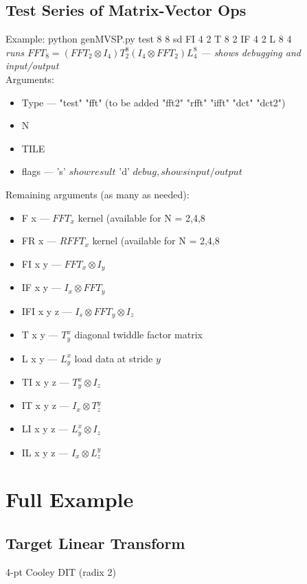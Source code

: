 \documentclass[11pt]{article}
\begin{document}
\subsection*{Test Series of Matrix-Vector Ops}
\noindent\makebox[\linewidth]{\rule{\textwidth}{1pt}} 
\newline Example: python genMVSP.py test 8 8 sd FI 4 2 T 8 2 IF 4 2 L 8 4\\
\emph{runs $FFT_8 = (FFT_2\otimes I_4)T^8_2(I_4\otimes FFT_2)L^8_4$ --- shows debugging and input/output}\\
\noindent\makebox[\linewidth]{\rule{\textwidth}{1pt}} 
\newline Arguments:
\begin{itemize}
\item Type --- "test" "fft" (to be added "fft2" "rfft" "ifft" "dct" "dct2")
\item N
\item TILE
\item flags --- 's' $show result$ 'd' $debug, shows input/output$
\end{itemize}
Remaining arguments (as many as needed):
\begin{itemize}
\item F x --- $FFT_{x}$ kernel (available for N = {2,4,8}
\item FR x --- $RFFT_{x}$ kernel (available for N = {2,4,8}
\item FI x y --- $FFT_{x}\otimes I_{y}$ 
\item IF x y --- $I_{x}\otimes FFT_{y}$ 
\item IFI x y z --- $I_{s}\otimes FFT_{y}\otimes I_{z}$ 
\item T x y --- $T^{x}_{y}$ diagonal twiddle factor matrix
\item L x y --- $L^{x}_{y}$ load data at stride $y$
\item TI x y z --- $T^{x}_{y}\otimes I_{z}$ 
\item IT x y z --- $I_{x} \otimes T^{y}_{z}$ 
\item LI x y z --- $L^{x}_{y}\otimes I_{z}$ 
\item IL x y z --- $I_{x} \otimes L^{y}_{z}$ 
\end{itemize}

\newpage
\section*{Full Example}
\subsection*{Target Linear Transform}
4-pt Cooley DIT (radix 2)
\end{document}
